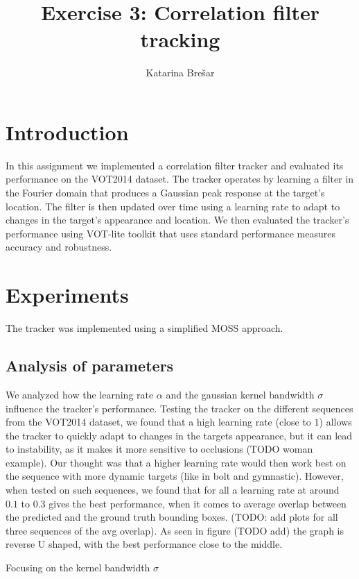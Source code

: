 \documentclass[9pt]{IEEEtran}
\title{\vspace{0ex}
Exercise 3: Correlation filter tracking}
\author{Katarina Brešar\vspace{-4.0ex}}
\begin{document}
\maketitle

\section{Introduction}

In this assignment we implemented a correlation filter tracker and evaluated its performance on the VOT2014 dataset.
The tracker operates by learning a filter in the Fourier domain that produces a Gaussian peak response at the
target's location. The filter is then updated over time using a learning rate to adapt to changes in the target's appearance and 
location. We then evaluated the tracker's performance using VOT-lite toolkit that uses standard performance measures
accuracy and robustness.

\section{Experiments}
The tracker was implemented using a simplified MOSS approach. 

\subsection{Analysis of parameters}
We analyzed how the learning rate $\alpha$ and the gaussian kernel bandwidth $\sigma$ influence the tracker's performance.
Testing the tracker on the different sequences from the VOT2014 dataset, we found that a high learning rate (close to $1$) allows the tracker
to quickly adapt to changes in the targets appearance, but it can lead to instability, as it makes it more sensitive to occlusions (TODO woman example).
Our thought was that a higher learning rate would then work best on the sequence with more dynamic targets (like in bolt and gymnastic). However, when
tested on such sequences, we found that for all a learning rate at around $0.1$ to $0.3$ gives the best performance, when it comes to
average overlap between the predicted and the ground truth bounding boxes. (TODO: add plots for all three sequences of the avg overlap).
As seen in figure (TODO add) the graph is reverse U shaped, with the best performance close to the middle.

Focusing on the kernel bandwidth $\sigma$
\end{document}
